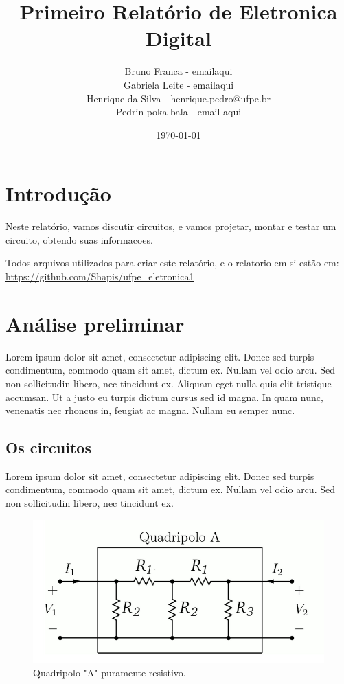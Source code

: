 \documentclass[12pt,twoside, a4paper, twocolumn]{article}
\title{Primeiro Relatório de Eletronica Digital}
\author{ Bruno Franca - emailaqui
\\ Gabriela Leite - emailaqui
\\ Henrique da Silva - henrique.pedro@ufpe.br
\\ Pedrin poka bala - email aqui}
\date{\today}
\begin{document}
\maketitle
{}
\newpage
\tableofcontents
\newpage




\section{Introdução}

Neste relatório, vamos discutir circuitos, e vamos projetar, montar e testar um circuito, obtendo suas informacoes.

Todos arquivos utilizados para criar este relatório, e o relatorio em si estão em:  \url{https://github.com/Shapis/ufpe_eletronica1}

\section{Análise preliminar}

Lorem ipsum dolor sit amet, consectetur adipiscing elit. Donec sed turpis condimentum, commodo quam sit amet, dictum ex. Nullam vel odio arcu. Sed non sollicitudin libero, nec tincidunt ex. Aliquam eget nulla quis elit tristique accumsan. Ut a justo eu turpis dictum cursus sed id magna. In quam nunc, venenatis nec rhoncus in, feugiat ac magna. Nullam eu semper nunc.

\subsection{Os circuitos}

Lorem ipsum dolor sit amet, consectetur adipiscing elit. Donec sed turpis condimentum, commodo quam sit amet, dictum ex. Nullam vel odio arcu. Sed non sollicitudin libero, nec tincidunt ex.

\begin{figure}[h]
    \centering
    \includegraphics[width=1\columnwidth]{images/quadripoloa.png}
    \caption{Quadripolo "A" puramente resistivo.}
\end{figure}
\end{document}
